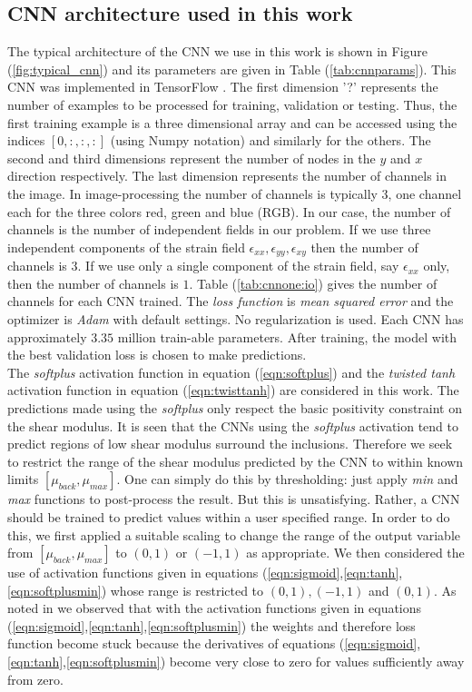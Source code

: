 \documentclass[12pt]{article}
\begin{document}
\subsection{\label{sect:cnnarch} CNN architecture used in this work}
The typical architecture of the CNN we use in this work is shown in Figure (\ref{fig:typical_cnn}) and its parameters are given in Table (\ref{tab:cnnparams}). This CNN was implemented in TensorFlow \cite{misc:tensorflow}. The first dimension '?' represents the number of examples to be processed for training, validation or testing. Thus, the first training example is a three dimensional array and can be accessed using the indices $[0,:,:,:]$ (using Numpy notation) and similarly for the others. The second and third dimensions represent the number of nodes in the $y$ and $x$ direction respectively. The last dimension represents the number of channels in the image. In image-processing the number of channels is typically $3$, one channel each for the three colors red, green and blue (RGB). In our case, the number of channels is the number of independent fields in our problem. If we use three independent components of the strain field $\epsilon_{xx},\epsilon_{yy},\epsilon_{xy}$ then the number of channels is $3$. If we use only a single component of the strain field, say $\epsilon_{xx}$ only, then the number of channels is $1$. Table (\ref{tab:cnnone:io}) gives the number of channels for each CNN trained. The \textit{loss function} is \textit{mean squared error} and the optimizer is \textit{Adam} with default settings. No regularization is used.  Each CNN has approximately $3.35$ million train-able parameters. After training, the model with the best validation loss is chosen to make predictions.\\The \textit{softplus} activation function in equation (\ref{eqn:softplus}) and the \textit{twisted tanh} activation function in equation (\ref{eqn:twisttanh}) are considered in this work. The predictions made using the \textit{softplus} only respect the basic positivity constraint on the shear modulus. It is seen that the CNNs using the \textit{softplus} activation tend to predict regions of low shear modulus surround the inclusions. Therefore we seek to restrict the range of the shear modulus predicted by the CNN to within known limits $[\mu_{back},\mu_{max}]$. One can simply do this by thresholding: just apply \textit{min} and \textit{max} functions to post-process the result. But this is unsatisfying. Rather, a CNN should be trained to predict values within a user specified range. In order to do this, we first applied a suitable scaling to change the range of the output variable from $[\mu_{back},\mu_{max}]$ to $(0,1)$ or $(-1,1)$ as appropriate. We then considered the use of activation functions given in equations (\ref{eqn:sigmoid},\ref{eqn:tanh},\ref{eqn:softplusmin}) whose range is restricted to $(0,1),(-1,1)$ and $(0,1)$. As noted in \cite{bookchap:lecun98b} we observed that with the activation functions given in equations (\ref{eqn:sigmoid},\ref{eqn:tanh},\ref{eqn:softplusmin}) the weights and therefore loss function become stuck because the derivatives of equations (\ref{eqn:sigmoid},\ref{eqn:tanh},\ref{eqn:softplusmin}) become very close to zero for values sufficiently away from zero. 
\end{document}

